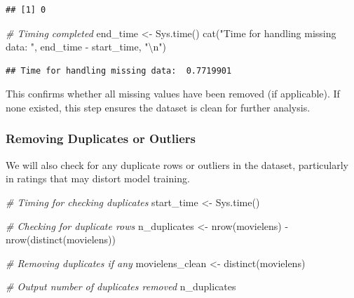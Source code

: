\documentclass[
]{article}
\newenvironment{Shaded}{}{}
\newcommand{\CommentTok}[1]{\textcolor[rgb]{0.38,0.63,0.69}{\textit{#1}}}
\newcommand{\FunctionTok}[1]{\textcolor[rgb]{0.02,0.16,0.49}{#1}}
\newcommand{\NormalTok}[1]{#1}
\newcommand{\OtherTok}[1]{\textcolor[rgb]{0.00,0.44,0.13}{#1}}
\newcommand{\SpecialCharTok}[1]{\textcolor[rgb]{0.25,0.44,0.63}{#1}}
\newcommand{\StringTok}[1]{\textcolor[rgb]{0.25,0.44,0.63}{#1}}
\begin{document}
\begin{verbatim}
## [1] 0
\end{verbatim}

\begin{Shaded}
\begin{Highlighting}[]
\CommentTok{\# Timing completed}
\NormalTok{end\_time }\OtherTok{\textless{}{-}} \FunctionTok{Sys.time}\NormalTok{()}
\FunctionTok{cat}\NormalTok{(}\StringTok{"Time for handling missing data: "}\NormalTok{, end\_time }\SpecialCharTok{{-}}\NormalTok{ start\_time, }\StringTok{"}\SpecialCharTok{\textbackslash{}n}\StringTok{"}\NormalTok{)}
\end{Highlighting}
\end{Shaded}

\begin{verbatim}
## Time for handling missing data:  0.7719901
\end{verbatim}

This confirms whether all missing values have been removed (if
applicable). If none existed, this step ensures the dataset is clean for
further analysis.

\subsubsection{Removing Duplicates or
Outliers}\label{removing-duplicates-or-outliers}

We will also check for any duplicate rows or outliers in the dataset,
particularly in ratings that may distort model training.

\begin{Shaded}
\begin{Highlighting}[]
\CommentTok{\# Timing for checking duplicates}
\NormalTok{start\_time }\OtherTok{\textless{}{-}} \FunctionTok{Sys.time}\NormalTok{()}

\CommentTok{\# Checking for duplicate rows}
\NormalTok{n\_duplicates }\OtherTok{\textless{}{-}} \FunctionTok{nrow}\NormalTok{(movielens) }\SpecialCharTok{{-}} \FunctionTok{nrow}\NormalTok{(}\FunctionTok{distinct}\NormalTok{(movielens))}

\CommentTok{\# Removing duplicates if any}
\NormalTok{movielens\_clean }\OtherTok{\textless{}{-}} \FunctionTok{distinct}\NormalTok{(movielens)}

\CommentTok{\# Output number of duplicates removed}
\NormalTok{n\_duplicates}
\end{Highlighting}
\end{Shaded}
\end{document}

